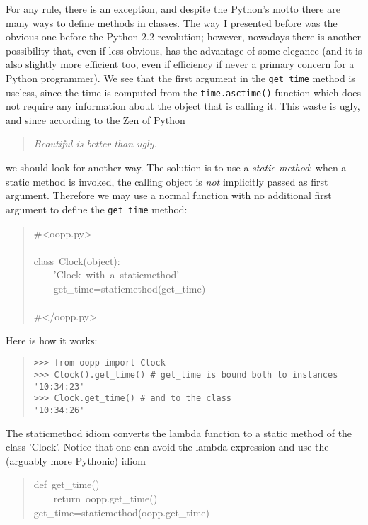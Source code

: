 \documentclass[10pt,english]{article}
\begin{document}
For any rule, there is an exception, and despite the Python's motto    
there are many ways to define methods in classes. The way I presented
before was the obvious one before the Python 2.2 revolution; however, 
nowadays there is another possibility that, even if less obvious, has the 
advantage of some elegance (and it is also slightly more efficient too, even if
efficiency if never a primary concern for a Python programmer).
We see that the first argument in the \texttt{get{\_}time} method is useless,
since the time is computed from the \texttt{time.asctime()} function which
does not require any information about the object that is calling
it. This waste is ugly, and since according to the Zen of Python
\begin{quote}

\emph{Beautiful is better than ugly.}
\end{quote}

we should look for another way. The solution is to use a \emph{static method}:
when a static method is invoked, the calling object is \emph{not} implicitly passed
as first argument. Therefore we may use a normal function with no additional
first argument to define the \texttt{get{\_}time} method:
\begin{quote}
\begin{ttfamily}\begin{flushleft}
\mbox{{\#}<oopp.py>}\\
\mbox{}\\
\mbox{class~Clock(object):}\\
\mbox{~~~~'Clock~with~a~staticmethod'}\\
\mbox{~~~~get{\_}time=staticmethod(get{\_}time)}\\
\mbox{}\\
\mbox{{\#}</oopp.py>}
\end{flushleft}\end{ttfamily}
\end{quote}

Here is how it works:
\begin{quote}
\begin{verbatim}>>> from oopp import Clock
>>> Clock().get_time() # get_time is bound both to instances
'10:34:23'
>>> Clock.get_time() # and to the class
'10:34:26'\end{verbatim}
\end{quote}

The staticmethod idiom converts the lambda function to a
static method of the class 'Clock'. Notice that one can avoid the
lambda expression and use the (arguably more Pythonic) idiom
\begin{quote}
\begin{ttfamily}\begin{flushleft}
\mbox{def~get{\_}time()}\\
\mbox{~~~~return~oopp.get{\_}time()}\\
\mbox{get{\_}time=staticmethod(oopp.get{\_}time)}
\end{flushleft}\end{ttfamily}
\end{quote}
\end{document}
